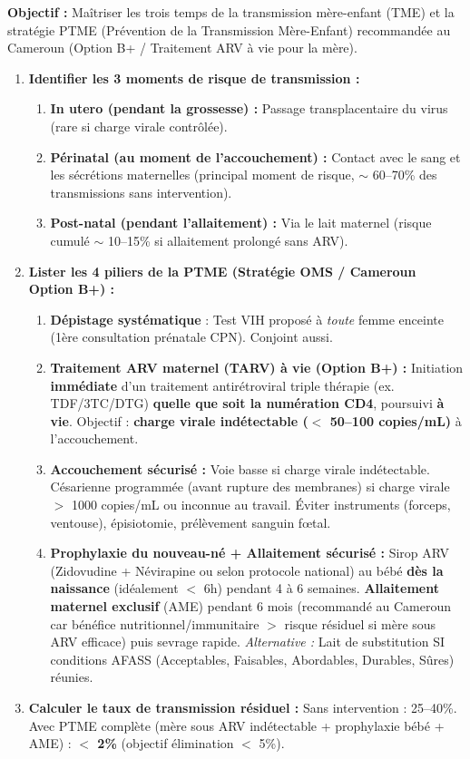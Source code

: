 \documentclass[11pt]{article}
\newcommand{\cle}[1]{{\popxbold\color{popdark}#1}}
\begin{document}
\begin{methode}
\textbf{Objectif :} Maîtriser les trois temps de la transmission mère-enfant (TME) et la stratégie \cle{PTME} (Prévention de la Transmission Mère-Enfant) recommandée au Cameroun (Option B+ / Traitement ARV à vie pour la mère).
\begin{enumerate}
    \item \textbf{Identifier les 3 moments de risque de transmission :}
    \begin{enumerate}
        \item \textbf{In utero (pendant la grossesse) :} Passage transplacentaire du virus (rare si charge virale contrôlée).
        \item \textbf{Périnatal (au moment de l'accouchement) :} Contact avec le sang et les sécrétions maternelles (principal moment de risque, $\sim$ 60--70\% des transmissions sans intervention).
        \item \textbf{Post-natal (pendant l'allaitement) :} Via le lait maternel (risque cumulé $\sim$ 10--15\% si allaitement prolongé sans ARV).
    \end{enumerate}
    \item \textbf{Lister les 4 piliers de la PTME (Stratégie OMS / Cameroun Option B+) :}
    \begin{enumerate}
        \item \textbf{Dépistage systématique} : Test VIH proposé à \emph{toute} femme enceinte (1ère consultation prénatale CPN). Conjoint aussi.
        \item \textbf{Traitement ARV maternel (TARV) à vie (Option B+) :} Initiation \textbf{immédiate} d'un traitement antirétroviral triple thérapie (ex. TDF/3TC/DTG) \textbf{quelle que soit la numération CD4}, poursuivi \textbf{à vie}. Objectif : \textbf{charge virale indétectable ($<$ 50--100 copies/mL)} à l'accouchement.
        \item \textbf{Accouchement sécurisé :} Voie basse si charge virale indétectable. Césarienne programmée (avant rupture des membranes) si charge virale $>$ 1000 copies/mL ou inconnue au travail. Éviter instruments (forceps, ventouse), épisiotomie, prélèvement sanguin fœtal.
        \item \textbf{Prophylaxie du nouveau-né + Allaitement sécurisé :} Sirop ARV (Zidovudine + Névirapine ou selon protocole national) au bébé \textbf{dès la naissance} (idéalement $<$ 6h) pendant 4 à 6 semaines. \textbf{Allaitement maternel exclusif} (AME) pendant 6 mois (recommandé au Cameroun car bénéfice nutritionnel/immunitaire $>$ risque résiduel si mère sous ARV efficace) puis sevrage rapide. \emph{Alternative :} Lait de substitution SI conditions AFASS (Acceptables, Faisables, Abordables, Durables, Sûres) réunies.
    \end{enumerate}
    \item \textbf{Calculer le taux de transmission résiduel :} Sans intervention : 25--40\%. Avec PTME complète (mère sous ARV indétectable + prophylaxie bébé + AME) : \textbf{$<$ 2\%} (objectif élimination $<$ 5\%).
\end{enumerate}
\end{methode}
\end{document}
